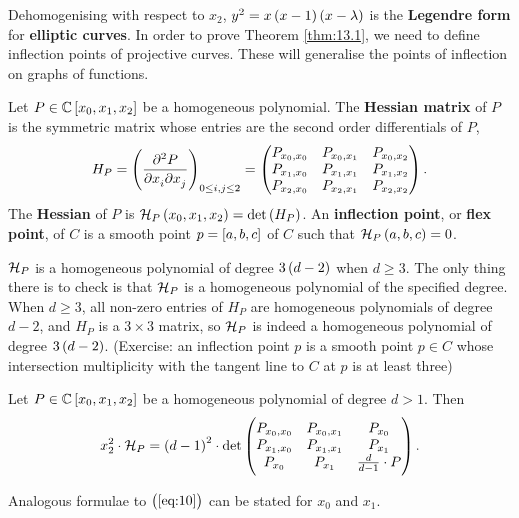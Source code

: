 Dehomogenising with respect to $ x_2 $, $ y^2 = x\br{x - 1}\br{x - \lambda} $ is the \textbf{Legendre form} for \textbf{elliptic curves}. In order to prove Theorem \ref{thm:13.1}, we need to define inflection points of projective curves. These will generalise the points of inflection on graphs of functions.

\begin{definition}
\label{def:13.2}
Let $ P \in \C\sbr{x_0, x_1, x_2} $ be a homogeneous polynomial. The \textbf{Hessian matrix} of $ P $ is the symmetric matrix whose entries are the second order differentials of $ P $,
$$ H_P = \br{\dmd{P}{2}{x_i}{}{x_j}{}}_{0 \le i, j \le 2} = \threebythree{P_{x_0, x_0}}{P_{x_0, x_1}}{P_{x_0, x_2}}{P_{x_1, x_0}}{P_{x_1, x_1}}{P_{x_1, x_2}}{P_{x_2, x_0}}{P_{x_2, x_1}}{P_{x_2, x_2}}. $$
The \textbf{Hessian} of $ P $ is $ \HH_P\br{x_0, x_1, x_2} = \det\br{H_P} $. An \textbf{inflection point}, or \textbf{flex point}, of $ C $ is a smooth point $ p = \sbr{a, b, c} $ of $ C $ such that $ \HH_P\br{a, b, c} = 0 $.
\end{definition}

$ \mathcal{H}_P $ is a homogeneous polynomial of degree $ 3\br{d - 2} $ when $ d \ge 3 $. The only thing there is to check is that $ \mathcal{H}_P $ is a homogeneous polynomial of the specified degree. When $ d \ge 3 $, all non-zero entries of $ H_P $ are homogeneous polynomials of degree $ d - 2 $, and $ H_P $ is a $ 3 \times 3 $ matrix, so $ \mathcal{H}_P $ is indeed a homogeneous polynomial of degree $ 3\br{d - 2} $. (Exercise: an inflection point $ p $ is a smooth point $ p \in C $ whose intersection multiplicity with the tangent line to $ C $ at $ p $ is at least three)

\begin{lemma}
\label{lem:13.3}
Let $ P \in \C\sbr{x_0, x_1, x_2} $ be a homogeneous polynomial of degree $ d > 1 $. Then
\begin{equation}
\label{eq:10}
x_2^2 \cdot \HH_P = \br{d - 1}^2 \cdot \det\threebythree{P_{x_0, x_0}}{P_{x_0, x_1}}{P_{x_0}}{P_{x_1, x_0}}{P_{x_1, x_1}}{P_{x_1}}{P_{x_0}}{P_{x_1}}{\tfrac{d}{d - 1} \cdot P}.
\end{equation}
\end{lemma}

\begin{remark}
Analogous formulae to $ \br{\ref{eq:10}} $ can be stated for $ x_0 $ and $ x_1 $.
\end{remark}


